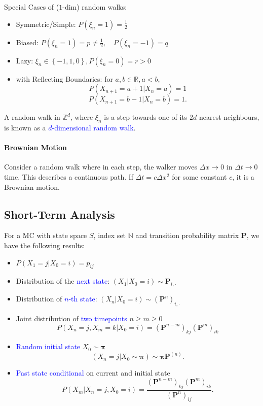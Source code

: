 \textcolor{Bittersweet}{Special Cases} of ($1$-dim) random walks:
\begin{itemize}
  \item Symmetric/Simple: $P\left( \xi_{n} =1\right) =\frac{1}{2}$
  \item Biased: $P\left( \xi_{n}=1 \right) =p\neq \frac{1}{2},\quad P\left( \xi_{n}=-1 \right)=q$
  \item Lazy: $\xi_{n}\in \left\{ -1,1,0 \right\},P\left( \xi_{n} =0\right) =r>0$
  \item with Reflecting Boundaries: for $a,b\in \mathbb{R},a<b$,
    \[P\left( X_{n+1}=a+1|X_{n}=a \right)=1\]\[P\left( X_{n+1}=b-1|X_{n}=b
  \right) =1.\] 
\end{itemize}
A random walk in $\mathbb{Z}^{d}$, where $\xi_{n}$ is a step towards one of its $2d$
nearest neighbours, is known as a \textcolor{Blue}{$d$-dimensional random
walk}.

\paragraph{Brownian Motion}
Consider a random walk where in each step, the walker moves $\Delta x\to 0$ in
$\Delta t\to 0$ time. This describes a continuous path.  If $\Delta t=c\Delta
x^{2}$ for some constant $c$, it is a \textcolor{Bittersweet}{Brownian motion}.

\subsection{Short-Term Analysis}
For a MC with state space $S$, index set $\mathbb{N}$ and transition probability matrix $\mathbf{P}$,
we have the following results:
\begin{itemize}
  \item $P\left( X_1=j|X_0=i \right)=p_{ij}$ 
  \item Distribution of the \textcolor{Blue}{next state}: $\left( X_1|X_0=i \right) \sim \mathbf{P}_{i,\cdot}$ 
  \item Distribution of \textcolor{Blue}{$n$-th state}: $\left( X_{n}|X_0=i \right) \sim\left( \mathbf{P}^{n} \right)_{i,\cdot}$
  \item Joint distribution of \textcolor{Blue}{two timepoints} $n\ge m\ge 0$
    \[P\left( X_{n}=j, X_m=k|X_0=i \right)={\left( \mathbf{P}^{n-m} \right)}_{kj}{\left( \mathbf{P}^{m} \right)}_{ik}\]
  \item \textcolor{Blue}{Random initial state} $X_0\sim\mathbf{\pi}$ 
    \[\left(X_{n}=j|X_0\sim\mathbf{\pi}\right)\sim\mathbf{\pi P}^{(n)}.\] 
  \item \textcolor{Blue}{Past state conditional} on current and initial state
    \[P\left( X_m |X_{n}=j,X_0=i \right)=\frac{{\left( \mathbf{P}^{n-m} \right)}_{kj}{\left( \mathbf{P}^{m} \right) }_{ik}}{{\left( \mathbf{P}^{n} \right) }_{ij}}.\] 
\end{itemize}

